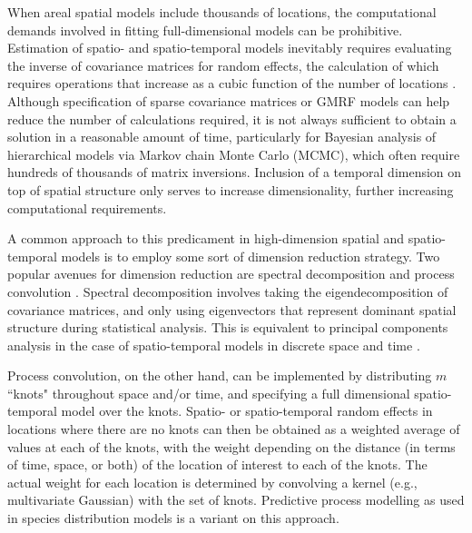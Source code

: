 \documentclass[times,mee,doublespace,]{besauth2}
\begin{document}
When areal spatial models include thousands of locations, the computational demands involved in fitting full-dimensional models can be prohibitive.  Estimation of spatio- and spatio-temporal models inevitably requires
evaluating the inverse of covariance matrices for random effects, the calculation of which requires operations that increase as a cubic function of the number of locations \citep{Wikle2010}.  Although specification of sparse covariance matrices or GMRF models can help reduce the number of calculations required, it is not always sufficient to obtain a solution in a reasonable amount of time, particularly for Bayesian analysis of
hierarchical models via Markov chain Monte Carlo (MCMC), which often require hundreds of thousands of matrix inversions.  Inclusion of a temporal dimension on top of spatial structure only serves to increase dimensionality, further increasing computational requirements.

A common approach to this predicament in high-dimension spatial and spatio-temporal models is to employ some sort of dimension reduction strategy. Two popular avenues for dimension reduction are spectral decomposition \citep[also called empirical orthogonal function analysis in geostatistical parlance;][]{Preisendorfer1988} and process convolution \citep[e.g.][]{Higdon1998}. Spectral decomposition involves taking the eigendecomposition of covariance matrices, and only using eigenvectors that represent dominant spatial structure during statistical analysis.  This is equivalent to principal components analysis in the case of spatio-temporal models in discrete space and time \citep{CressieWikle2011}.

Process convolution, on the other hand, can be implemented by distributing $m$ ``knots" throughout space and/or time, and specifying a full dimensional spatio-temporal model over the knots.  Spatio- or spatio-temporal random effects in locations where there are no knots can then be obtained as a weighted average of values at each of the knots, with the weight depending on the distance (in terms of time, space, or both) of the location of interest to each of the knots.  The actual weight for each location is determined by convolving a kernel (e.g., multivariate Gaussian) with the set of knots.  Predictive process modelling \citep{BanerjeeEtAl2008} as used in species distribution models \citep[e.g.][]{LatimerEtAl2009} is a variant on this approach.
\end{document}
